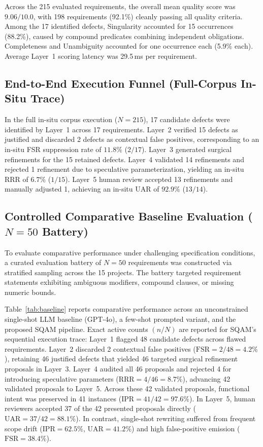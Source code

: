 \documentclass[journal]{IEEEtran}
\begin{document}
Across the 215 evaluated requirements, the overall mean quality score was $9.06/10.0$, with 198 requirements (92.1\%) cleanly passing all quality criteria. Among the 17 identified defects, Singularity accounted for 15 occurrences (88.2\%), caused by compound predicates combining independent obligations. Completeness and Unambiguity accounted for one occurrence each (5.9\% each). Average Layer~1 scoring latency was 29.5\,ms per requirement.

\subsection{End-to-End Execution Funnel (Full-Corpus In-Situ Trace)}
\label{sec:funnel-results}

In the full in-situ corpus execution ($N=215$), 17 candidate defects were identified by Layer~1 across 17 requirements. Layer~2 verified 15 defects as justified and discarded 2 defects as contextual false positives, corresponding to an in-situ FSR suppression rate of $11.8\%$ ($2/17$). Layer~3 generated surgical refinements for the 15 retained defects. Layer~4 validated 14 refinements and rejected 1 refinement due to speculative parameterization, yielding an in-situ RRR of $6.7\%$ ($1/15$). Layer~5 human review accepted 13 refinements and manually adjusted 1, achieving an in-situ UAR of $92.9\%$ ($13/14$).

\subsection{Controlled Comparative Baseline Evaluation ($N=50$ Battery)}
\label{sec:baseline-results}

To evaluate comparative performance under challenging specification conditions, a curated evaluation battery of $N=50$ requirements was constructed via stratified sampling across the 15 projects. The battery targeted requirement statements exhibiting ambiguous modifiers, compound clauses, or missing numeric bounds. 

Table~\ref{tab:baseline} reports comparative performance across an unconstrained single-shot LLM baseline (GPT-4o), a few-shot prompted variant, and the proposed SQAM pipeline. Exact active counts $(n/N)$ are reported for SQAM's sequential execution trace: Layer~1 flagged 48 candidate defects across flawed requirements. Layer~2 discarded 2 contextual false positives ($\text{FSR} = 2/48 = 4.2\%$), retaining 46 justified defects that yielded 46 targeted surgical refinement proposals in Layer~3. Layer~4 audited all 46 proposals and rejected 4 for introducing speculative parameters ($\text{RRR} = 4/46 = 8.7\%$), advancing 42 validated proposals to Layer~5. Across these 42 validated proposals, functional intent was preserved in 41 instances ($\text{IPR} = 41/42 = 97.6\%$). In Layer~5, human reviewers accepted 37 of the 42 presented proposals directly ($\text{UAR} = 37/42 = 88.1\%$). In contrast, single-shot rewriting suffered from frequent scope drift ($\text{IPR} = 62.5\%$, $\text{UAR} = 41.2\%$) and high false-positive emission ($\text{FSR} = 38.4\%$).
\end{document}

